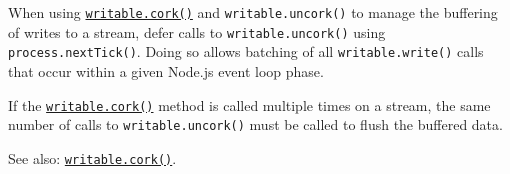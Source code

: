 When using \hyperref[writablecork]{\texttt{writable.cork()}} and
\texttt{writable.uncork()} to manage the buffering of writes to a
stream, defer calls to \texttt{writable.uncork()} using
\texttt{process.nextTick()}. Doing so allows batching of all
\texttt{writable.write()} calls that occur within a given Node.js event
loop phase.

\begin{Shaded}
\begin{Highlighting}[]
\NormalTok{()}\OperatorTok{;}
\NormalTok{(}\NormalTok{)}\OperatorTok{;}
\NormalTok{(}\NormalTok{)}\OperatorTok{;}
\NormalTok{(() }\KeywordTok{=\textgreater{}}\NormalTok{())}\OperatorTok{;}
\end{Highlighting}
\end{Shaded}

If the \hyperref[writablecork]{\texttt{writable.cork()}} method is
called multiple times on a stream, the same number of calls to
\texttt{writable.uncork()} must be called to flush the buffered data.

\begin{Shaded}
\begin{Highlighting}[]
\NormalTok{()}\OperatorTok{;}
\NormalTok{(}\NormalTok{)}\OperatorTok{;}
\NormalTok{()}\OperatorTok{;}
\NormalTok{(}\NormalTok{)}\OperatorTok{;}
\NormalTok{(() }\KeywordTok{=\textgreater{}}\NormalTok{ \{}
\NormalTok{()}\OperatorTok{;}
\NormalTok{()}\OperatorTok{;}
\NormalTok{\})}\OperatorTok{;}
\end{Highlighting}
\end{Shaded}

See also: \hyperref[writablecork]{\texttt{writable.cork()}}.

